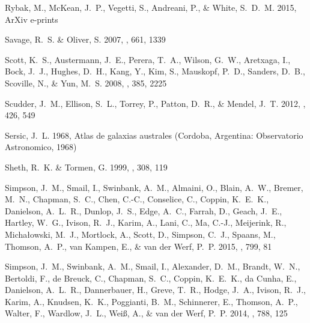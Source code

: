 \documentclass[iop]{emulateapj}
\begin{document}
\begin{thebibliography}{107}
{Rybak}, M., {McKean}, J.~P., {Vegetti}, S., {Andreani}, P., \& {White},
  S.~D.~M. 2015, ArXiv e-prints

{Savage}, R.~S. \& {Oliver}, S. 2007, \apj, 661, 1339

{Scott}, K.~S., {Austermann}, J.~E., {Perera}, T.~A., {Wilson}, G.~W.,
  {Aretxaga}, I., {Bock}, J.~J., {Hughes}, D.~H., {Kang}, Y., {Kim}, S.,
  {Mauskopf}, P.~D., {Sanders}, D.~B., {Scoville}, N., \& {Yun}, M.~S. 2008,
  \mnras, 385, 2225

{Scudder}, J.~M., {Ellison}, S.~L., {Torrey}, P., {Patton}, D.~R., \& {Mendel},
  J.~T. 2012, \mnras, 426, 549

{Sersic}, J.~L. 1968, {Atlas de galaxias australes} (Cordoba, Argentina:
  Observatorio Astronomico, 1968)

{Sheth}, R.~K. \& {Tormen}, G. 1999, \mnras, 308, 119

{Simpson}, J.~M., {Smail}, I., {Swinbank}, A.~M., {Almaini}, O., {Blain},
  A.~W., {Bremer}, M.~N., {Chapman}, S.~C., {Chen}, C.-C., {Conselice}, C.,
  {Coppin}, K.~E.~K., {Danielson}, A.~L.~R., {Dunlop}, J.~S., {Edge}, A.~C.,
  {Farrah}, D., {Geach}, J.~E., {Hartley}, W.~G., {Ivison}, R.~J., {Karim}, A.,
  {Lani}, C., {Ma}, C.-J., {Meijerink}, R., {Micha{\l}owski}, M.~J.,
  {Mortlock}, A., {Scott}, D., {Simpson}, C.~J., {Spaans}, M., {Thomson},
  A.~P., {van Kampen}, E., \& {van der Werf}, P.~P. 2015, \apj, 799, 81

{Simpson}, J.~M., {Swinbank}, A.~M., {Smail}, I., {Alexander}, D.~M., {Brandt},
  W.~N., {Bertoldi}, F., {de Breuck}, C., {Chapman}, S.~C., {Coppin}, K.~E.~K.,
  {da Cunha}, E., {Danielson}, A.~L.~R., {Dannerbauer}, H., {Greve}, T.~R.,
  {Hodge}, J.~A., {Ivison}, R.~J., {Karim}, A., {Knudsen}, K.~K., {Poggianti},
  B.~M., {Schinnerer}, E., {Thomson}, A.~P., {Walter}, F., {Wardlow}, J.~L.,
  {Wei{\ss}}, A., \& {van der Werf}, P.~P. 2014, \apj, 788, 125


\end{thebibliography}
\end{document}

